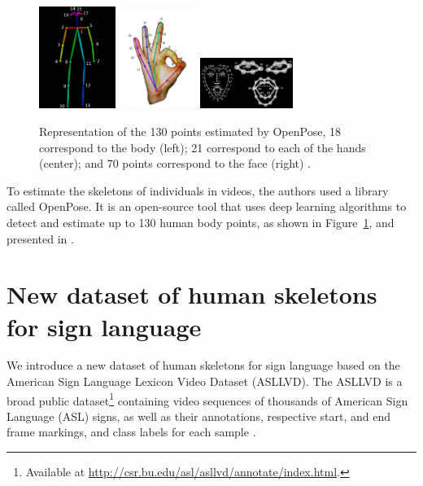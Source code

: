 \begin{figure}[ht]
    \centering
    \includegraphics[width=2.5cm]{images/keypoints_pose_COCO_18}
    \includegraphics[width=2.5cm]{images/keypoints_hand}
    \includegraphics[width=3cm]{images/keypoints_face}
    \caption{Representation of the 130 points estimated by OpenPose, 18 correspond to the body (left); 21 correspond to each of the hands (center); and 70 points correspond to the face (right) \cite{openpose-output-2018}.}
    \label{fig:keypoints-openpose}
\end{figure}

To estimate the skeletons of individuals in videos, the authors \cite{st-gcn-2018} used a library called OpenPose. It is an open-source tool that uses deep learning algorithms to detect and estimate up to 130 human body points, as shown in Figure~\ref{fig:keypoints-openpose}, and presented in \cite{cao-realtime-2017, simon-hand-2017, wei-cpm-2016}.


\section{New dataset of human skeletons \\ for sign language} 
\label{sec:new-dataset}

We introduce a new dataset of human skeletons for sign language based on the American Sign Language Lexicon Video Dataset (ASLLVD). The ASLLVD  is a broad public dataset\footnote{ Available at \url{http://csr.bu.edu/asl/asllvd/annotate/index.html}.} containing video sequences of thousands of American Sign Language (ASL) signs, as well as their annotations, respective start, and end frame markings, and class labels for each sample \cite{ athitsos-asllvd-2008, neidle-2012, vloger-2012}.

